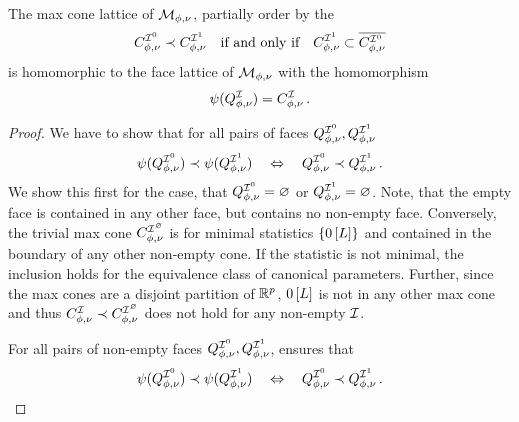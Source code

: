 \begin{theorem}\label{the:faceSetsToMaxCones}
    The max cone lattice of $\mathcal{M}_{\phi,\nu}$, partially order by the
    \begin{align*}
        C_{\phi,\nu}^{\mathcal{I}^{0}} \prec C_{\phi,\nu}^{\mathcal{I}^{1}} \quad \text{if and only if} \quad
        C_{\phi,\nu}^{\mathcal{I}^{1}} \subset \overline{C_{\phi,\nu}^{\mathcal{I}^{0}}}
    \end{align*}
    is homomorphic to the face lattice of $\mathcal{M}_{\phi,\nu}$ with the homomorphism
    \begin{align*}
        \psi(Q^{\mathcal{I}}_{\phi,\nu}) = C_{\phi,\nu}^{\mathcal{I}} \, .
    \end{align*}
\end{theorem}
\begin{proof}
    We have to show that for all pairs of faces $Q^{\mathcal{I}^{0}}_{\phi,\nu},Q^{\mathcal{I}^{1}}_{\phi,\nu}$
    \begin{align*}
        \psi(Q^{\mathcal{I}^{0}}_{\phi,\nu}) \prec \psi(Q^{\mathcal{I}^{1}}_{\phi,\nu}) \quad \Leftrightarrow \quad Q^{\mathcal{I}^{0}}_{\phi,\nu} \prec Q^{\mathcal{I}^{1}}_{\phi,\nu} \, .
    \end{align*}
    We show this first for the case, that $Q^{\mathcal{I}^{0}}_{\phi,\nu}=\varnothing$ or $Q^{\mathcal{I}^{1}}_{\phi,\nu}=\varnothing$.
    Note, that the empty face is contained in any other face, but contains no non-empty face.
    Conversely, the trivial max cone $C_{\phi,\nu}^{\mathcal{I}^{\varnothing}}$ is for minimal statistics $\{0\left[L\right]\}$ and contained in the boundary of any other non-empty cone.
    If the statistic is not minimal, the inclusion holds for the equivalence class of canonical parameters.
    Further, since the max cones are a disjoint partition of $\mathbb{R}^{p}$, $0\left[L\right]$ is not in any other max cone and thus $C_{\phi,\nu}^{\mathcal{I}} \prec C_{\phi,\nu}^{\mathcal{I}^{\varnothing}}$ does not hold for any non-empty $\mathcal{I}$.

    For all pairs of non-empty faces $Q^{\mathcal{I}^{0}}_{\phi,\nu},Q^{\mathcal{I}^{1}}_{\phi,\nu}$,  ensures that
    \begin{align*}
        \psi(Q^{\mathcal{I}^{0}}_{\phi,\nu}) \prec \psi(Q^{\mathcal{I}^{1}}_{\phi,\nu}) \quad \Leftrightarrow \quad Q^{\mathcal{I}^{0}}_{\phi,\nu} \prec Q^{\mathcal{I}^{1}}_{\phi,\nu} \, .
    \end{align*}
\end{proof}

